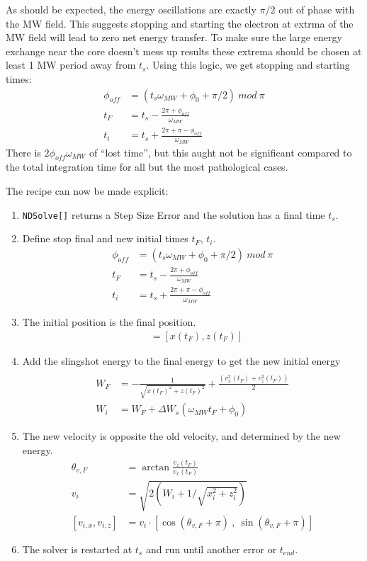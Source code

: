 \documentclass[aps,pra,preprint,groupedaddress]{revtex4-1}
\begin{document}
As should be expected, the energy oscillations are exactly $\pi/2$ out of phase with the MW field. This suggests stopping and starting the electron at extrma of the MW field will lead to zero net energy transfer. To make sure the large energy exchange near the core doesn't mess up results these extrema should be chosen at least 1 MW period away from $t_s$. Using this logic, we get stopping and starting times:
\begin{align*}
\phi_{off} & = \left( t_s \omega_{MW} + \phi_0 +\pi/2 \right) ~mod~ \pi \\
t_F & = t_s - \frac{2\pi + \phi_{off}}{\omega_{MW}} \\
t_i & = t_s + \frac{2\pi + \pi - \phi_{off}}{\omega_{MW}}
\end{align*}
There is $2\phi_{off} \omega_{MW}$ of ``lost time'', but this aught not be significant compared to the total integration time for all but the most pathological cases.

The recipe can now be made explicit:
\begin{enumerate}
	\item \texttt{NDSolve[]} returns a Step Size Error and the solution has a final time $t_s$.
	
	\item Define stop final and new initial times $t_F$, $t_i$. \begin{align*}
	\phi_{off} & = (t_s \omega_{MW} + \phi_0 + \pi/2) ~ mod ~ \pi \\
	t_F & = t_s - \frac{2\pi + \phi_{off}}{\omega_{MW}} \\
	t_i & = t_s + \frac{2\pi + \pi - \phi_{off}}{\omega_{MW}}
	\end{align*}
	
	\item The initial position is the final position. \begin{align*}
	[x_i, z_i] & = [x(t_F), z(t_F)]
	\end{align*}
	
	\item Add the slingshot energy to the final energy to get the new initial energy \begin{align*} \\
	W_F & = -\frac{1}{\sqrt{x(t_F)^2 + z(t_F)^2}} + \frac{(v_x^2(t_F) + v_z^2(t_F))}{2}\\
	W_i & = W_F + \Delta W_s(\omega_{MW} t_F + \phi_0)
	\end{align*}
	
	\item The new velocity is opposite the old velocity, and determined by the new energy. \begin{align*}
	\theta_{v,F} & = \arctan{\frac{v_z(t_F)}{v_x(t_F)}} \\
	v_i & = \sqrt{2 \left( W_i + 1/\sqrt{x_i^2 + z_i^2} \right) } \\
	[v_{i,x}, v_{i,z}] & = v_i \cdot \left[ \cos{(\theta_{v,F} + \pi)} ~ , ~ \sin{(\theta_{v,F} + \pi)} \right]
	\end{align*}
	
	\item The solver is restarted at $t_s$ and run until another error or $t_{end}$.
\end{enumerate}
\end{document}
